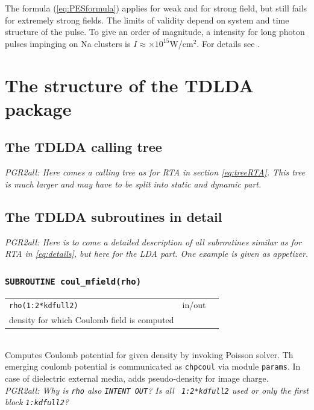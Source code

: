 \documentclass[final,1p]{elsarticle}
\newcommand{\PGRcomm}[1]{{\color{blue}\small\em PGR2all: #1}}
\begin{document}
The formula (\ref{eq:PESformula}) applies for weak and for strong
field, but still fails for extremely strong fields. The limits of
validity depend on system and time structure of the pulse.  To give an
order of magnitude, a intensity for long photon pulses impinging on Na
clusters is $I\approx\times{10}^{15}$W/cm$^2$. For details see
\cite{Din13a}.


\section{The structure of the TDLDA package}
\label{sec:TDLDAnum}


\subsection{The TDLDA calling tree}

\PGRcomm{Here comes a calling tree as for RTA in section
  \ref{eq:treeRTA}. This tree is much larger and may have to be
  split into static and dynamic part.
}

\subsection{The TDLDA subroutines in detail}
\label{eq:detailsTDLDA}


\PGRcomm{Here is to come a detailed description of all subroutines
  similar as for RTA in \ref{eq:details}, but here for the LDA part.
One example is given as appetizer.
}

\subsubsection*{\tt SUBROUTINE coul\_mfield(rho)}
\begin{tabular}{lcl}
 {\tt rho(1:2*kdfull2)} & in/out & \\ density for which Coulomb field
 is computed
\end{tabular}
\\[4pt]
Computes Coulomb potential for given density by invoking
Poisson solver.
Th emerging coulomb potential is communicated as {\tt chpcoul}
via module {\tt params}.
In case of dielectric external media, adds pseudo-density for image
charge.
\\
\PGRcomm{Why is {\tt rho} also {\tt INTENT OUT}? Is all {\tt
    1:2*kdfull2} used or only the first block {\tt 1:kdfull2}?}



\end{document}
